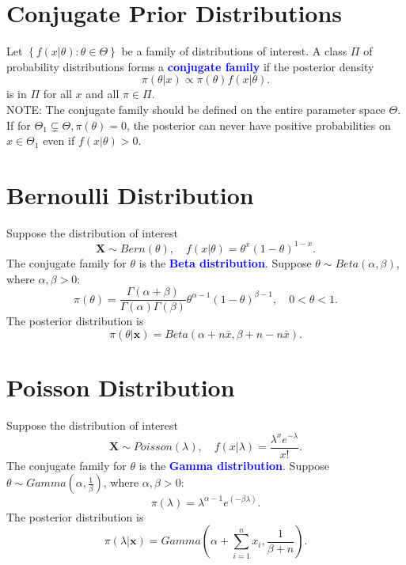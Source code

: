 \section{Conjugate Prior Distributions}
Let $\left\{ f\left( x|\theta \right) : \theta\in \Theta \right\} $ be a family
of distributions of interest. A class $\Pi$ of probability distributions
forms a \textcolor{Blue}{\textbf{conjugate family}} if the posterior density
\[\pi\left( \theta|x \right) \propto \pi\left( \theta \right) f\left( x|\theta
\right) .\]
is in $\Pi$ for all $x$ and all $\pi \in \Pi$.\\

\textcolor{Bittersweet}{NOTE:} The conjugate family should be defined on the
entire parameter space $\Theta$. If for $\Theta_1\subsetneq \Theta, \pi \left(
\theta \right) =0$, the posterior can \textcolor{Bittersweet}{never} have
positive probabilities on $x\in \Theta_1$ even if $f\left( x|\theta \right)
>0$.

\section{Bernoulli Distribution}
Suppose the distribution of interest
\[\mathbf{X}\sim Bern\left( \theta \right),\quad f\left( x|\theta \right) =\theta^{x}{\left( 1-\theta \right) }^{1-x}.\]
The conjugate family for $\theta$ is the \textcolor{Blue}{\textbf{Beta
distribution}}. Suppose $\theta\sim Beta\left( \alpha,\beta \right)$, where $
\alpha, \beta >0$:
\[\pi\left( \theta \right) =\frac{\Gamma \left(\alpha +\beta \right) }{\Gamma \left( \alpha \right) \Gamma \left( \beta \right) }\theta^{\alpha -1}{\left(1-\theta \right) }^{\beta -1},\quad 0<\theta<1.\]
The posterior distribution is
\[\pi\left( \theta|\mathbf{x} \right) =Beta\left(
\alpha +n \bar{x},\beta +n-n \bar{x} \right).\]

\section{Poisson Distribution}
Suppose the distribution of interest
\[\mathbf{X}\sim Poisson\left( \lambda \right),\quad f\left( x|\lambda \right) =\frac{\lambda^{x}e^{-\lambda }}{x!}.\]
The conjugate family for $\theta$ is the \textcolor{Blue}{\textbf{Gamma
distribution}}. Suppose $\theta\sim Gamma\left( \alpha,\frac{1}{\beta} \right)$, where
$\alpha, \beta >0$:
\[\pi \left( \lambda \right) =\lambda^{\alpha-1}e^{\left( -\beta\lambda \right)
}.\]
The posterior distribution is
\[\pi \left( \lambda|\mathbf{x} \right) =Gamma\left( \alpha +\sum_{i=1}^{n}x_{i},\frac{1}{\beta +n} \right).\]


